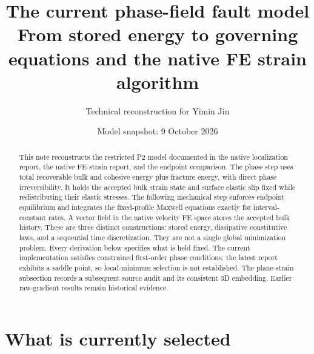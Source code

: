 \documentclass[11pt,a4paper]{article}
\title{The current phase-field fault model\\
\large From stored energy to governing equations and the native FE strain algorithm}
\author{Technical reconstruction for Yimin Jin}
\date{Model snapshot: 9 October 2026}
\begin{document}
\maketitle
\begin{abstract}
This note reconstructs the restricted P2 model documented in the native
localization report, the native FE strain report, and the endpoint comparison.
The phase step uses total recoverable bulk and cohesive energy plus fracture
energy, with direct phase irreversibility. It holds the accepted bulk strain
state and surface elastic slip fixed while redistributing their elastic stresses.
The following mechanical step enforces endpoint equilibrium and integrates
the fixed-profile Maxwell equations exactly for interval-constant rates.
A vector field in the native velocity FE space stores the accepted bulk history.
These are three distinct constructions: stored energy, dissipative constitutive
laws, and a sequential time discretization. They are not a single global
minimization problem. Every derivation below specifies what is held fixed.
The current implementation satisfies constrained first-order phase conditions;
the latest report exhibits a saddle point, so local-minimum selection is not
established. The plane-strain subsection records a subsequent source audit and its
consistent 3D embedding. Earlier raw-gradient results remain historical evidence.
\end{abstract}

{\small\setlength{\parskip}{0pt}\tableofcontents}
\clearpage

\section{What is currently selected}
\label{sec:status}
\end{document}

